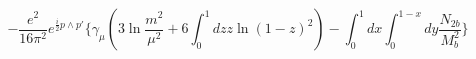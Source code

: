 \begin{equation}
-\frac{e^{2}}{16\pi^{2}}e^{\frac{i}{2}p\wedge
p'}\biggl\{\gamma_{\mu}\left(3\ln\frac{m^{2}}{\mu^{2}}+6\int_{0}^{1}dz
z\ln(1-z)^{2}\right)-\int_{0}^{1}dx\int_{0}^{1-x}dy\frac{N_{2b}}{M^{2}_{b}}\biggr\}
\end{equation}

